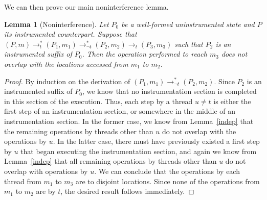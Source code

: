 \documentclass[preprint, 10pt]{sigplanconf}
\newcommand{\cfg}[2]{\ensuremath{(#1, #2)}}
\newcommand{\execstart}[4]{\ensuremath{\cfg{#1}{#2} \rightarrow^{*}_{#3} #4}}
\newcommand{\execstarm}[4]{\ensuremath{\cfg{#1}{#2} \rightarrow^{*}_{\neg #3} #4}}
\newcommand{\execs}[3]{\ensuremath{ \xrightarrow{#2}_{#1} #3}}
\newcommand{\execstarms}[2]{\ensuremath{ \rightarrow^{*}_{\neg #1} #2}}
\newtheorem{lemma}{Lemma}
\begin{document}
We can then prove our main noninterference lemma.
\begin{lemma}[Noninterference]\label{noninterference}Let $P_0$ be a well-formed uninstrumented state and $P$ its instrumented counterpart. Suppose that $\execstart{P}{m}{t}{(P_1, m_1)} \execstarms{t}{(P_2, m_2)} \execs{t}{}{(P_3, m_3)}$ such that $P_2$ is an instrumented suffix of $P_0$. Then the operation performed to reach $m_3$ does not overlap with the locations accessed from $m_1$ to $m_2$.\end{lemma}
\begin{proof}By induction on the derivation of $\execstarm{P_1}{m_1}{t}{(P_2, m_2)}$. Since $P_2$ is an instrumented suffix of $P_0$, we know that no instrumentation section is completed in this section of the execution. Thus, each step by a thread $u \neq t$ is either the first step of an instrumentation section, or somewhere in the middle of an instrumentation section. In the former case, we know from Lemma~\ref{indep} that the remaining operations by threads other than $u$ do not overlap with the operations by $u$. In the latter case, there must have previously existed a first step by $u$ that began executing the instrumentation section, and again we know from Lemma~\ref{indep} that all remaining operations by threads other than $u$ do not overlap with operations by $u$. We can conclude that the operations by each thread from $m_1$ to $m_3$ are to disjoint locations. Since none of the operations from $m_1$ to $m_2$ are by $t$, the desired result follows immediately.\end{proof}
\end{document}

